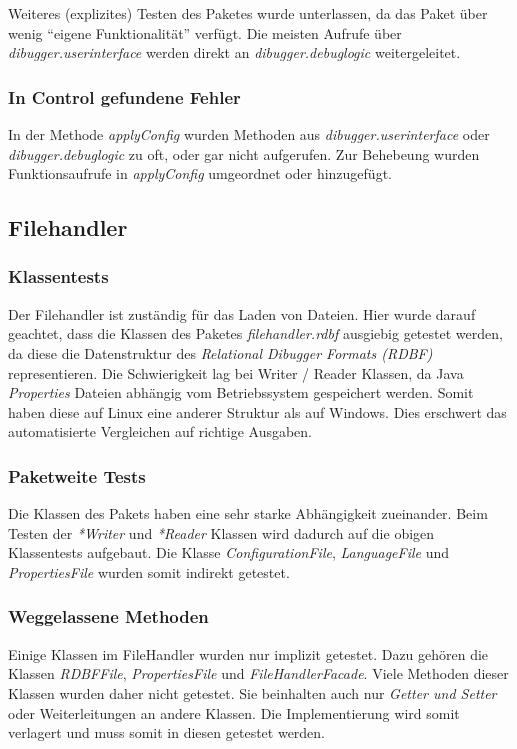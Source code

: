 \documentclass[parskip=full]{scrartcl}
\begin{document}
Weiteres (explizites) Testen des Paketes wurde unterlassen, da das Paket über wenig \enquote{eigene Funktionalität} verfügt.
Die meisten Aufrufe über \textit{dibugger.userinterface} werden direkt an \textit{dibugger.debuglogic} weitergeleitet.
\subsubsection{In Control gefundene Fehler}
In der Methode \textit{applyConfig} wurden Methoden aus \textit{dibugger.userinterface} oder \textit{dibugger.debuglogic} zu oft, oder gar nicht aufgerufen.
Zur Behebeung wurden Funktionsaufrufe in \textit{applyConfig} umgeordnet oder hinzugefügt.
\subsection{Filehandler}
\subsubsection{Klassentests}
Der Filehandler ist zuständig für das Laden von Dateien. Hier wurde darauf geachtet, dass die Klassen des Paketes \textit{filehandler.rdbf} ausgiebig getestet werden, da diese die Datenstruktur des \textit{Relational Dibugger Formats (RDBF)} representieren.
Die Schwierigkeit lag bei Writer / Reader Klassen, da Java \textit{Properties} Dateien abhängig vom Betriebssystem gespeichert werden. Somit haben diese auf Linux eine anderer Struktur als auf Windows. Dies erschwert das automatisierte Vergleichen auf richtige Ausgaben.

\subsubsection{Paketweite Tests}
Die Klassen des Pakets haben eine sehr starke Abhängigkeit zueinander. Beim Testen der \textit{*Writer} und \textit{*Reader} Klassen wird dadurch auf die obigen Klassentests aufgebaut. Die Klasse \textit{ConfigurationFile}, \textit{LanguageFile} und \textit{PropertiesFile} wurden somit indirekt getestet.

\subsubsection{Weggelassene Methoden}
Einige Klassen im FileHandler wurden nur implizit getestet. Dazu gehören die Klassen \textit{RDBFFile}, \textit{PropertiesFile} und \textit{FileHandlerFacade}.
Viele Methoden dieser Klassen wurden daher nicht getestet. Sie beinhalten auch nur \textit{Getter und Setter} oder Weiterleitungen an andere Klassen. Die Implementierung wird somit verlagert und muss somit in diesen getestet werden.
\end{document}
